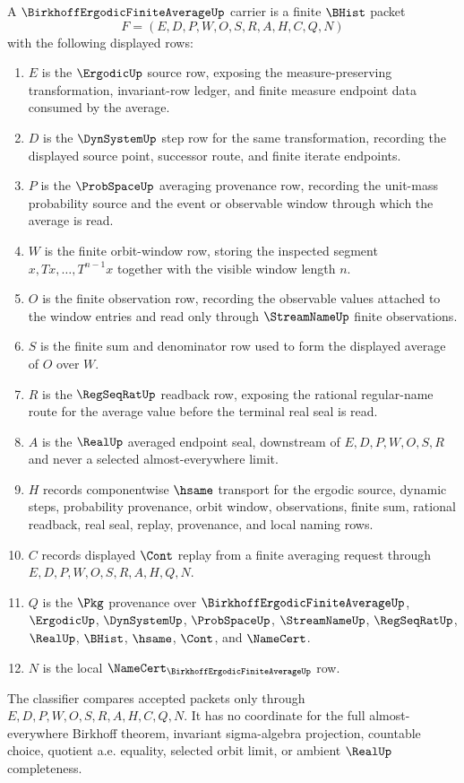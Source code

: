 \begin{definition}
\label{def:birkhoff-ergodic-finite-average-carrier}
A $\BirkhoffErgodicFiniteAverageUp$ carrier is a finite $\BHist$ packet
$$
F=(E,D,P,W,O,S,R,A,H,C,Q,N)
$$
with the following displayed rows:
\begin{enumerate}
\item $E$ is the $\ErgodicUp$ source row, exposing the measure-preserving transformation, invariant-row ledger, and finite measure endpoint data consumed by the average.
\item $D$ is the $\DynSystemUp$ step row for the same transformation, recording the displayed source point, successor route, and finite iterate endpoints.
\item $P$ is the $\ProbSpaceUp$ averaging provenance row, recording the unit-mass probability source and the event or observable window through which the average is read.
\item $W$ is the finite orbit-window row, storing the inspected segment $x,Tx,\ldots,T^{n-1}x$ together with the visible window length $n$.
\item $O$ is the finite observation row, recording the observable values attached to the window entries and read only through $\StreamNameUp$ finite observations.
\item $S$ is the finite sum and denominator row used to form the displayed average of $O$ over $W$.
\item $R$ is the $\RegSeqRatUp$ readback row, exposing the rational regular-name route for the average value before the terminal real seal is read.
\item $A$ is the $\RealUp$ averaged endpoint seal, downstream of $E,D,P,W,O,S,R$ and never a selected almost-everywhere limit.
\item $H$ records componentwise $\hsame$ transport for the ergodic source, dynamic steps, probability provenance, orbit window, observations, finite sum, rational readback, real seal, replay, provenance, and local naming rows.
\item $C$ records displayed $\Cont$ replay from a finite averaging request through $E,D,P,W,O,S,R,A,H,Q,N$.
\item $Q$ is the $\Pkg$ provenance over $\BirkhoffErgodicFiniteAverageUp$, $\ErgodicUp$, $\DynSystemUp$, $\ProbSpaceUp$, $\StreamNameUp$, $\RegSeqRatUp$, $\RealUp$, $\BHist$, $\hsame$, $\Cont$, and $\NameCert$.
\item $N$ is the local $\NameCert_{\BirkhoffErgodicFiniteAverageUp}$ row.
\end{enumerate}
The classifier compares accepted packets only through $E,D,P,W,O,S,R,A,H,C,Q,N$. It has no coordinate for the full almost-everywhere Birkhoff theorem, invariant sigma-algebra projection, countable choice, quotient a.e. equality, selected orbit limit, or ambient $\RealUp$ completeness.
\end{definition}


